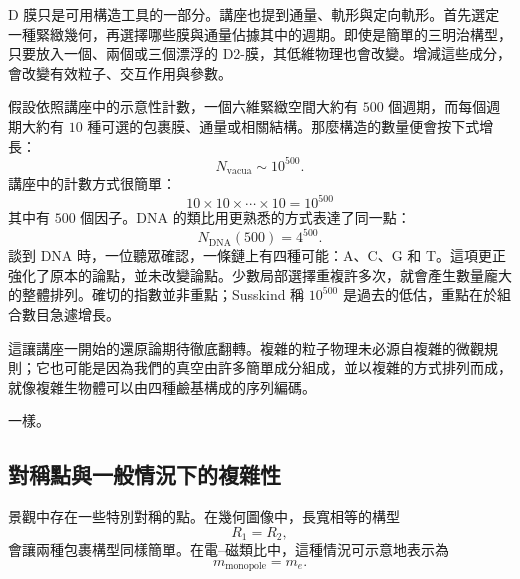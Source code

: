 D 膜只是可用構造工具的一部分。講座也提到通量、軌形與定向軌形。首先選定一種緊緻幾何，再選擇哪些膜與通量佔據其中的週期。即使是簡單的三明治構型，只要放入一個、兩個或三個漂浮的 D2-膜，其低維物理也會改變。增減這些成分，會改變有效粒子、交互作用與參數。

假設依照講座中的示意性計數，一個六維緊緻空間大約有 \(500\) 個週期，而每個週期大約有 \(10\) 種可選的包裹膜、通量或相關結構。那麼構造的數量便會按下式增長：
\begin{equation}
N_{\mathrm{vacua}} \sim 10^{500}.
\end{equation}
講座中的計數方式很簡單：
\begin{equation}
10 \times 10 \times \cdots \times 10 = 10^{500}
\end{equation}
其中有 \(500\) 個因子。DNA 的類比用更熟悉的方式表達了同一點：
\begin{equation}
N_{\mathrm{DNA}}(500)=4^{500}.
\end{equation}
談到 DNA 時，一位聽眾確認，一條鏈上有四種可能：A、C、G 和 T。這項更正強化了原本的論點，並未改變論點。少數局部選擇重複許多次，就會產生數量龐大的整體排列。確切的指數並非重點；Susskind 稱 \(10^{500}\) 是過去的低估，重點在於組合數目急遽增長。

這讓講座一開始的還原論期待徹底翻轉。複雜的粒子物理未必源自複雜的微觀規則；它也可能是因為我們的真空由許多簡單成分組成，並以複雜的方式排列而成，就像複雜生物體可以由四種鹼基構成的序列編碼。

\begin{classroomqa}
一樣。\end{classroomqa}

\subsection{對稱點與一般情況下的複雜性}

景觀中存在一些特別對稱的點。在幾何圖像中，長寬相等的構型
\begin{equation}
R_1=R_2,
\end{equation}
會讓兩種包裹構型同樣簡單。在電--磁類比中，這種情況可示意地表示為
\begin{equation}
m_{\mathrm{monopole}}=m_e.
\end{equation}

